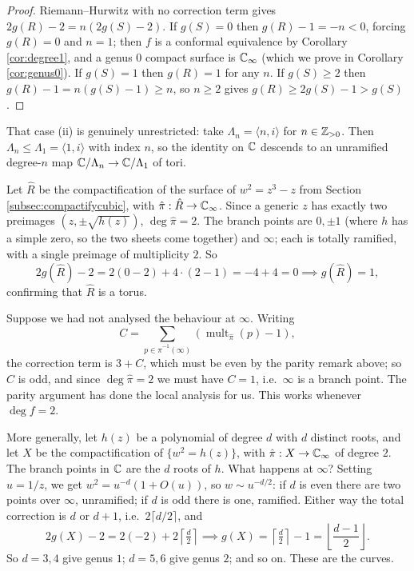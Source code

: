 \documentclass[a4paper]{scrartcl}
\newcommand{\genby}[1]{\langle #1 \rangle}
\newcommand{\Cinf}{\C_\infty}
\newcommand{\mult}{\operatorname{mult}}
\begin{document}
\begin{proof}
	Riemann--Hurwitz with no correction term gives $2g(R)-2 = n(2g(S)-2)$. If $g(S)=0$ then
	$g(R) - 1 = -n < 0$, forcing $g(R) = 0$ and $n = 1$; then $f$ is a conformal equivalence
	by Corollary \ref{cor:degree1}, and a genus $0$ compact surface is $\Cinf$ (which we
	prove in Corollary \ref{cor:genus0}). If $g(S)=1$ then $g(R)=1$ for any $n$. If
	$g(S)\geq 2$ then $g(R) - 1 = n(g(S)-1) \geq n$, so $n \geq 2$ gives
	$g(R) \geq 2g(S)-1 > g(S)$.
\end{proof}

\begin{example}
	That case (ii) is genuinely unrestricted: take $\Lambda_n = \genby{n, i}$ for
	$n \in \mathbb{Z}_{>0}$. Then $\Lambda_n \leq \Lambda_1 = \genby{1,i}$ with index $n$, so the
	identity on $\mathbb{C}$ descends to an unramified degree-$n$ map $\mathbb{C}/\Lambda_n \to \mathbb{C}/\Lambda_1$
	of tori.
\end{example}

\begin{example}\label{ex:cubicgenus}
	Let $\hat R$ be the compactification of the surface of $w^2 = z^3-z$ from Section
	\ref{subsec:compactifycubic}, with $\hat\pi : \hat R \to \Cinf$. Since a generic $z$
	has exactly two preimages $(z,\pm\sqrt{h(z)})$, $\deg\hat\pi = 2$. The branch points are
	$0, \pm 1$ (where $h$ has a simple zero, so the two sheets come together) and $\infty$;
	each is totally ramified, with a single preimage of multiplicity $2$. So
	$$
	2g(\hat R) - 2 = 2(0 - 2) + 4\cdot(2-1) = -4 + 4 = 0 \implies g(\hat R) = 1,
	$$
	confirming that $\hat R$ is a torus.
\end{example}

\begin{remark}
	Suppose we had not analysed the behaviour at $\infty$. Writing
	$$
	C = \sum_{p \in \hat\pi^{-1}(\infty)}\left(\mult_{\hat\pi}(p)-1\right),
	$$
	the correction term is
	$3 + C$, which must be even by the parity remark above; so $C$ is odd, and since
	$\deg\hat\pi = 2$ we must have $C = 1$, i.e.\ $\infty$ is a branch point. The parity
	argument has done the local analysis for us. This works whenever $\deg f = 2$.
\end{remark}

\begin{example}
	More generally, let $h(z)$ be a polynomial of degree $d$ with $d$ distinct roots, and
	let $X$ be the compactification of $\{w^2 = h(z)\}$, with $\hat\pi : X \to \Cinf$ of
	degree $2$. The branch points in $\mathbb{C}$ are the $d$ roots of $h$. What happens at
	$\infty$? Setting $u = 1/z$, we get $w^2 = u^{-d}(1 + O(u))$, so $w \sim u^{-d/2}$: if
	$d$ is even there are two points over $\infty$, unramified; if $d$ is odd there is one,
	ramified. Either way the total correction is $d$ or $d+1$, i.e.\ $2\lceil d/2\rceil$,
	and
	$$
	2g(X) - 2 = 2(-2) + 2\left\lceil \tfrac d2\right\rceil \implies g(X) = \left\lceil \tfrac d2\right\rceil - 1 = \left\lfloor \frac{d-1}{2}\right\rfloor.
	$$
	So $d = 3, 4$ give genus $1$; $d = 5,6$ give genus $2$; and so on. These are the
	 curves.
\end{example}
\end{document}
